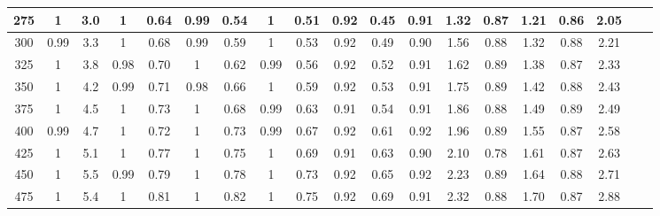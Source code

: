 \documentclass[preprint,12pt]{elsarticle}
\begin{document}
\begin{landscape}
\begin{table}[b]
\begin{tabular}{c c c  c c c c c c c c c c c c c c c c}
275		&		1    & 3.0	&	1    & 0.64 	&		0.99 & 	0.54	&		1    & 0.51			&	 0.92 &	0.45  &  0.91 & 1.32  &	0.87 &	1.21 &	0.86 & 	2.05 \\\hline
300		&		0.99 & 3.3	&	1    & 0.68   &		0.99 & 	0.59	&		1    & 0.53   	&	 0.92 &	0.49  &  0.90 & 1.56  &	0.88 &	1.32 &	0.88 &  2.21\\\hline
325		&		1    & 3.8  & 0.98 & 0.70  	&		1    & 	0.62	&		0.99 & 0.56			&	 0.92 &	0.52  &  0.91 & 1.62  &	0.89 &	1.38 &	0.87 & 	2.33 \\\hline
350		&		1    & 4.2	& 0.99 & 0.71		&		0.98 &  0.66	&		1    & 0.59			&	 0.92 &	0.53  &  0.91 & 1.75  &	0.89 &	1.42 &	0.88 & 	2.43 \\\hline
375		&		1    & 4.5  & 1    & 0.73		&		1    & 	0.68	&		0.99 & 0.63			&	 0.91 &	0.54  &  0.91 & 1.86  &	0.88 &	1.49 &	0.89 & 	2.49 \\\hline
400		&		0.99 & 4.7  & 1    & 0.72		&		1    & 	0.73	&		0.99 & 0.67	  	&	 0.92 &	0.61  &  0.92 & 1.96  &	0.89 &	1.55 &	0.87 & 	2.58 \\\hline
425		&		1    & 5.1  & 1    & 0.77		&		1    & 	0.75	&		1    & 0.69			&	 0.91 &	0.63  &  0.90 & 2.10  &	0.78 &	1.61 &	0.87 & 	2.63 \\\hline
450		&		1    & 5.5  & 0.99 & 0.79		&		1    & 	0.78	&		1    & 0.73			&	 0.92 &	0.65  &  0.92 & 2.23  &	0.89 &	1.64 &	0.88 & 	2.71 \\\hline
475		&		1    & 5.4  & 1    & 0.81		&		1    & 	0.82	&		1    & 0.75			&	 0.92 &	0.69  &  0.91 & 2.32  &	0.88 &	1.70 &	0.87 & 	2.88 \\\hline
\bottomrule
\end{tabular}
\end{table}
\end{landscape}
\end{document}
